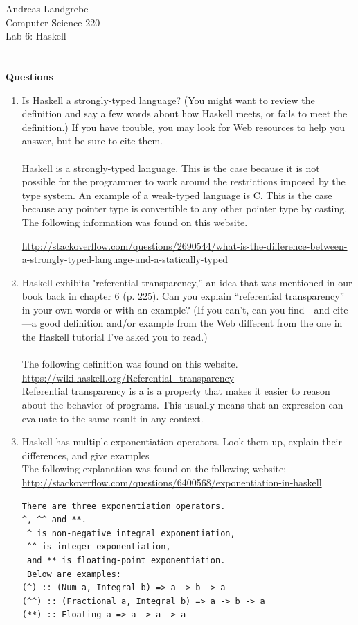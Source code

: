 \documentclass{article}
\begin{document}
\noindent
Andreas Landgrebe\\
Computer Science 220\\
Lab 6: Haskell\\
\\
\\
\textbf{Questions}
\begin{enumerate}
\item Is Haskell a strongly-typed language? (You might want to review the definition and say a few words about how Haskell meets, or fails to meet the definition.) If you have trouble, you may look for Web resources to help you answer, but be sure to cite them.
\\
\\
Haskell is a strongly-typed language. This is the case because it is not possible for the programmer to work around the restrictions imposed by the type system. An example of a weak-typed language is C. This is the case because any pointer type is convertible to any other pointer type by casting.
\\
The following information was found on this website.

\url{http://stackoverflow.com/questions/2690544/what-is-the-difference-between-a-strongly-typed-language-and-a-statically-typed}

\item Haskell exhibits "referential transparency,” an idea that was mentioned in our book back in
chapter 6 (p. 225). Can you explain “referential transparency” in your own words or with an
example? (If you can’t, can you find—and cite—a good definition and/or example from the
Web different from the one in the Haskell tutorial I’ve asked you to read.)
\\
\\
The following definition was found on this website.
\\
\url{https://wiki.haskell.org/Referential_transparency}
\\
Referential transparency is a is a property that makes it easier to reason about the behavior of programs. This usually means that an expression can evaluate to the same result in any context. 
\\
\item Haskell has multiple exponentiation operators. Look them up, explain their differences, and
give examples
\\
The following explanation was found on the following website:
\\
\url{http://stackoverflow.com/questions/6400568/exponentiation-in-haskell}
\\
\begin{lstlisting}
There are three exponentiation operators. 
^, ^^ and **.
 ^ is non-negative integral exponentiation, 
 ^^ is integer exponentiation, 
 and ** is floating-point exponentiation. 
 Below are examples:
(^) :: (Num a, Integral b) => a -> b -> a
(^^) :: (Fractional a, Integral b) => a -> b -> a
(**) :: Floating a => a -> a -> a
\end{lstlisting}


\end{enumerate}
\end{document}
